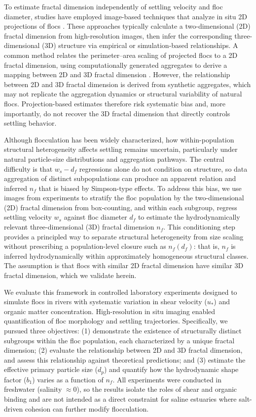 \documentclass{agujournal2019}
\begin{document}
To estimate fractal dimension independently of settling velocity and floc diameter, studies have employed image-based techniques that analyze in situ 2D projections of flocs \cite{jarvis2005measuring}. These approaches typically calculate a two-dimensional (2D) fractal dimension from high-resolution images, then infer the corresponding three-dimensional (3D) structure via empirical or simulation-based relationships. A common method relates the perimeter--area scaling of projected flocs to a 2D fractal dimension, using computationally generated aggregates to derive a mapping between 2D and 3D fractal dimension \cite{lee2004prediction, maggi2004method, tang2015reconstructing}. However, the relationship between 2D and 3D fractal dimension is derived from synthetic aggregates, which may not replicate the aggregation dynamics or structural variability of natural flocs. Projection-based estimates therefore risk systematic bias and, more importantly, do not recover the 3D fractal dimension that directly controls settling behavior.

Although flocculation has been widely characterized, how within-population structural heterogeneity affects settling remains uncertain, particularly under natural particle-size distributions and aggregation pathways. The central difficulty is that $w_s - d_f$ regressions alone do not condition on structure, so data aggregation of distinct subpopulations can produce an apparent relation and inferred $n_f$ that is biased by Simpson-type effects. To address this bias, we use images from experiments to stratify the floc population by the two-dimensional (2D) fractal dimension from box-counting, and within each subgroup, regress settling velocity $w_s$ against floc diameter $d_f$ to estimate the hydrodynamically relevant three-dimensional (3D) fractal dimension $n_f$. This conditioning step provides a principled way to separate structural heterogeneity from size scaling without prescribing a population-level closure such as $n_f(d_f)$: that is, $n_f$ is inferred hydrodynamically within approximately homogeneous structural classes. The assumption is that flocs with similar 2D fractal dimension have similar 3D fractal dimension, which we validate herein.

We evaluate this framework in controlled laboratory experiments designed to simulate flocs in rivers with systematic variation in shear velocity ($u_*$) and organic matter concentration. High-resolution in situ imaging enabled quantification of floc morphology and settling trajectories. Specifically, we pursued three objectives: (1) demonstrate the existence of structurally distinct subgroups within the floc population, each characterized by a unique fractal dimension; (2) evaluate the relationship between 2D and 3D fractal dimension, and assess this relationship against theoretical predictions; and (3) estimate the effective primary particle size ($d_p$) and quantify how the hydrodynamic shape factor ($b_1$) varies as a function of $n_f$. All experiments were conducted in freshwater (salinity $\approx 0$), so the results isolate the roles of shear and organic binding and are not intended as a direct constraint for saline estuaries where salt-driven cohesion can further modify flocculation.
\end{document}

